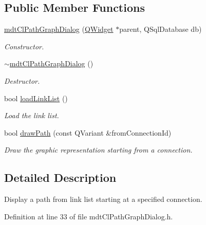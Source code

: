 \subsection*{Public Member Functions}
\begin{DoxyCompactItemize}
\item 
\hyperlink{classmdt_cl_path_graph_dialog_afcc2054a4da9c47c1ffc6de248e8a410}{mdt\-Cl\-Path\-Graph\-Dialog} (\hyperlink{class_q_widget}{Q\-Widget} $\ast$parent, Q\-Sql\-Database db)
\begin{DoxyCompactList}\small\item\em Constructor. \end{DoxyCompactList}\item 
\hyperlink{classmdt_cl_path_graph_dialog_a2bce7d330797ffa3d2deaa3725a72d5a}{$\sim$mdt\-Cl\-Path\-Graph\-Dialog} ()
\begin{DoxyCompactList}\small\item\em Destructor. \end{DoxyCompactList}\item 
bool \hyperlink{classmdt_cl_path_graph_dialog_a241b794bd923c18a358c675e1dbbf8bf}{load\-Link\-List} ()
\begin{DoxyCompactList}\small\item\em Load the link list. \end{DoxyCompactList}\item 
bool \hyperlink{classmdt_cl_path_graph_dialog_a0a4600a04a033c0daccac04baa626c02}{draw\-Path} (const Q\-Variant \&from\-Connection\-Id)
\begin{DoxyCompactList}\small\item\em Draw the graphic representation starting from a connection. \end{DoxyCompactList}\end{DoxyCompactItemize}


\subsection{Detailed Description}
Display a path from link list starting at a specified connection. 

Definition at line 33 of file mdt\-Cl\-Path\-Graph\-Dialog.\-h.




